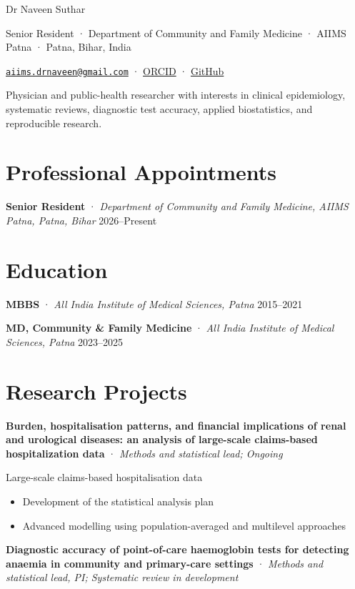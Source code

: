 \documentclass[
  english,
  10pt,
]{article}
\author{}
\date{}
\providecommand{\tightlist}{%
  \setlength{\itemsep}{0pt}\setlength{\parskip}{0pt}}
\begin{document}
Dr Naveen Suthar

Senior Resident · Department of Community and Family Medicine · AIIMS
Patna · Patna, Bihar, India

\href{mailto:aiims.drnaveen@gmail.com}{\nolinkurl{aiims.drnaveen@gmail.com}}
· \href{0009-0005-6171-8600}{ORCID} ·
\href{https://github.com/DrNaveen01}{GitHub}

Physician and public-health researcher with interests in clinical
epidemiology, systematic reviews, diagnostic test accuracy, applied
biostatistics, and reproducible research.

\section{Professional Appointments}

\textbf{Senior Resident} · \emph{Department of Community and Family
Medicine, AIIMS Patna, Patna, Bihar} \textbar{} 2026--Present

\section{Education}

\textbf{MBBS} · \emph{All India Institute of Medical Sciences, Patna}
\textbar{} 2015--2021

\textbf{MD, Community \& Family Medicine} · \emph{All India Institute of
Medical Sciences, Patna} \textbar{} 2023--2025

\section{Research Projects}

\textbf{Burden, hospitalisation patterns, and financial implications of
renal and urological diseases: an analysis of large-scale claims-based
hospitalization data} · \emph{Methods and statistical lead; Ongoing}

Large-scale claims-based hospitalisation data

\begin{itemize}
\tightlist
\item
  Development of the statistical analysis plan
\item
  Advanced modelling using population-averaged and multilevel approaches
\end{itemize}

\textbf{Diagnostic accuracy of point-of-care haemoglobin tests for
detecting anaemia in community and primary-care settings} ·
\emph{Methods and statistical lead, PI; Systematic review in
development}
\end{document}

